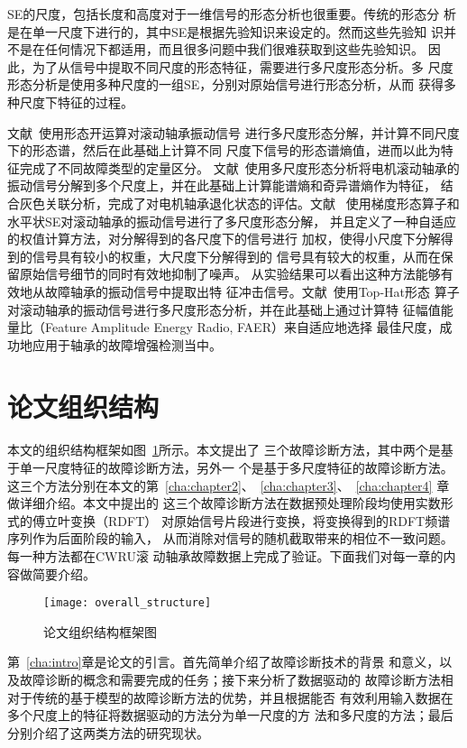 SE的尺度，包括长度和高度对于一维信号的形态分析也很重要。传统的形态分
析是在单一尺度下进行的，其中SE是根据先验知识来设定的。然而这些先验知
识并不是在任何情况下都适用，而且很多问题中我们很难获取到这些先验知识。
因此，为了从信号中提取不同尺度的形态特征，需要进行多尺度形态分析。多
尺度形态分析是使用多种尺度的一组SE，分别对原始信号进行形态分析，从而
获得多种尺度下特征的过程。

文献~使用形态开运算对滚动轴承振动信号
进行多尺度形态分解，并计算不同尺度下的形态谱，然后在此基础上计算不同
尺度下信号的形态谱熵值，进而以此为特征完成了不同故障类型的定量区分。
文献~使用多尺度形态分析将电机滚动轴承的
振动信号分解到多个尺度上，并在此基础上计算能谱熵和奇异谱熵作为特征，
结合灰色关联分析，完成了对电机轴承退化状态的评估。文献~
使用梯度形态算子和水平状SE对滚动轴承的振动信号进行了多尺度形态分解，
并且定义了一种自适应的权值计算方法，对分解得到的各尺度下的信号进行
加权，使得小尺度下分解得到的信号具有较小的权重，大尺度下分解得到的
信号具有较大的权重，从而在保留原始信号细节的同时有效地抑制了噪声。
从实验结果可以看出这种方法能够有效地从故障轴承的振动信号中提取出特
征冲击信号。文献~使用Top-Hat形态
算子对滚动轴承的振动信号进行多尺度形态分析，并在此基础上通过计算特
征幅值能量比（Feature Amplitude Energy Radio, FAER）来自适应地选择
最佳尺度，成功地应用于轴承的故障增强检测当中。

\section{论文组织结构}

本文的组织结构框架如图~\ref{fig:overall_structure}所示。本文提出了
三个故障诊断方法，其中两个是基于单一尺度特征的故障诊断方法，另外一
个是基于多尺度特征的故障诊断方法。这三个方法分别在本文的第~\ref{cha:chapter2}、~\ref{cha:chapter3}、~\ref{cha:chapter4}
章做详细介绍。本文中提出的
这三个故障诊断方法在数据预处理阶段均使用实数形式的傅立叶变换（RDFT）
对原始信号片段进行变换，将变换得到的RDFT频谱序列作为后面阶段的输入，
从而消除对信号的随机截取带来的相位不一致问题。每一种方法都在CWRU滚
动轴承故障数据上完成了验证。下面我们对每一章的内容做简要介绍。
\begin{figure}[ht]
  \centering
  \texttt{[image: overall\_structure]}
  \caption{论文组织结构框架图}
  \label{fig:overall_structure}
\end{figure}

第~\ref{cha:intro}章是论文的引言。首先简单介绍了故障诊断技术的背景
和意义，以及故障诊断的概念和需要完成的任务；接下来分析了数据驱动的
故障诊断方法相对于传统的基于模型的故障诊断方法的优势，并且根据能否
有效利用输入数据在多个尺度上的特征将数据驱动的方法分为单一尺度的方
法和多尺度的方法；最后分别介绍了这两类方法的研究现状。

